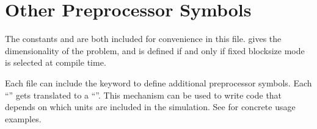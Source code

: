 \section{Other Preprocessor Symbols}
\label{Sec:FlashHother}
The constants  and  are both included
for convenience in this file.  gives the dimensionality of
the problem, and  is defined if and only if fixed blocksize mode is
selected at compile time.

Each  file can include the  keyword to
define additional preprocessor symbols. Each ``'' gets translated to a 
``''.
This mechanism can be used to write code that depends on which
units are included in the simulation. 
See  for concrete usage examples.

